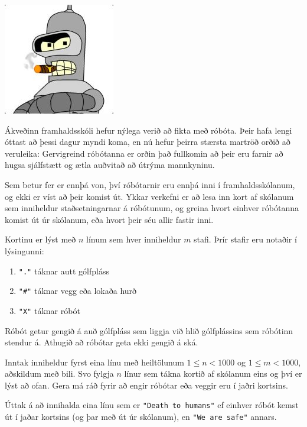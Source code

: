 
\includegraphics[scale=0.4]{bender.jpg}

Ákveðinn framhaldsskóli hefur nýlega verið að fikta með róbóta. Þeir hafa lengi
óttast að þessi dagur myndi koma, en nú hefur þeirra stærsta martröð orðið að
veruleika: Gervigreind róbótanna er orðin það fullkomin að þeir eru farnir að hugsa
sjálfstætt og ætla auðvitað að útrýma mannkyninu.

Sem betur fer er ennþá von, því róbótarnir eru ennþá inni í framhaldsskólanum,
og ekki er víst að þeir komist út. Ykkar verkefni er að lesa inn kort af
skólanum sem inniheldur staðsetningarnar á róbótunum, og greina hvort einhver
róbótanna komist út úr skólanum, eða hvort þeir séu allir fastir inni.

Kortinu er lýst með $n$ línum sem hver inniheldur $m$ stafi. Þrír stafir eru
notaðir í lýsingunni:

\begin{enumerate}
\item \texttt{"."} táknar autt gólfpláss
\item \texttt{"\#"} táknar vegg eða lokaða hurð
\item \texttt{"X"} táknar róbót
\end{enumerate}

Róbót getur gengið á auð gólfpláss sem liggja við hlið gólfplássins sem
róbótinn stendur á. Athugið að róbótar geta ekki gengið á ská.

Inntak inniheldur fyrst eina línu með heiltölunum $1 \leq n < 1000$ og $1 \leq
m < 1000$, aðskildum með bili. Svo fylgja $n$ línur sem tákna kortið af
skólanum eins og því er lýst að ofan. Gera má ráð fyrir að engir róbótar eða
veggir eru í jaðri kortsins.

Úttak á að innihalda eina línu sem er \texttt{"Death to humans"} ef
einhver róbót kemst út í jaðar kortsins (og þar með út úr skólanum), en
\texttt{"We are safe"} annars.

